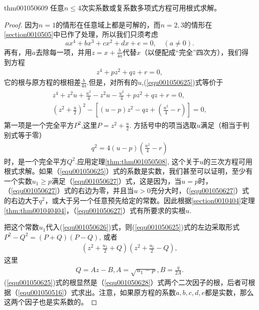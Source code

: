 \begin{theorem}{}{thm001050609}
任意$n \le 4$次实系数或复系数多项式方程可用根式求解。
\end{theorem}

\begin{proof}
因为$n=1$的情形在任意域上都是可解的，而$n=2,3$的情形在\ref{section0010505}中已作了处理，所以我们只须考虑
\[
ax^4+bx^3+cx^2+dx+e=0,\quad (a \neq 0).
\]
再有，用$a$去除每一项，并用$z = x + \frac{b}{4a}$代替$x$（以便配成“完全”四次方），我们得到方程
\begin{gather}\label{equ001050625}
z^4 + pz^2 + qz + r = 0,
\end{gather}
它的根与原方程的根相差$\frac{b}{4a}$.但是，对所有的$u$,(\ref{equ001050625})式等价于
\begin{gather}\label{equ001050626}
\begin{gathered}
z^4+z^2u+\frac{u^2}{4} - z^2u - \frac{u^2}{4} + pz^2 + qz + r = 0,\\
(z^2 + \frac{u}{2})^2 - \left[(u-p)z^2 - qz + (\frac{u^2}{4} - r)\right] = 0,
\end{gathered}
\end{gather}
第一项是一个完全平方$P^2$,这里$P = z^2 + \frac{u}{2}$. 方括号中的项当选取$u$满足（相当于判别式等于零）
\begin{gather}\label{equ001050627}
q^2 = 4(u-p)(\frac{u^2}{4} - r)
\end{gather}
时，是一个完全平方$Q^2$.应用定理\ref{thm:thm001050508}, 这个关于$u$的三次方程可用根式求解。如果（\ref{equ001050625}）式的系数是实数，我们甚至可以证明，至少有一个实数$u_1 \ge p$满足（\ref{equ001050627}）式，这是因为，当$u=p$时，（\ref{equ001050627}）式的右边为零，并且当$u > 0$充分大时，（\ref{equ001050627}）式的右边大于$q^2$，或大于另一个任意预先给定的常数。因此根据\ref{section0010404}定理\ref{thm:thm001040404}，（\ref{equ001050627}）式有所要求的实根$u$.

把这个常数$u_1$代入(\ref{equ001050626})式，则(\ref{equ001050625})式的左边采取形式$P^2-Q^2 = (P+Q)(P-Q)$, 或者
\begin{gather}\label{equ001050628}
\left(z^2 + \frac{u_1}{2} + Q\right)\left(z^2 + \frac{u_1}{2} - Q\right),
\end{gather}
这里
\begin{gather}\label{equ001050629}
Q = Az-B, A = \sqrt{u_1 - p}, B = \frac{q}{2A}.
\end{gather}
(\ref{equ001050625})式的根显然是（\ref{equ001050628}）式两个二次因子的根，后者可根据（\ref{equ001050516}）式求出。注意，如果原方程的系数$a,b,c,d,e$都是实数，那么这两个因子也是实系数的。
\end{proof}

